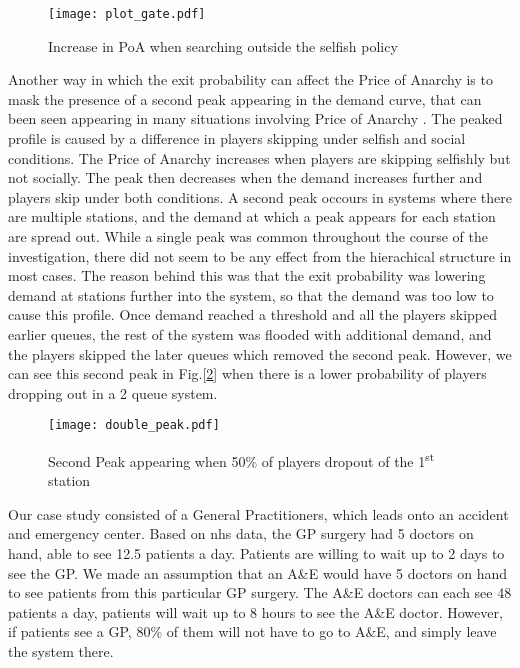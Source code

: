 \documentclass[12pt]{article}
\begin{document}
    \begin{figure}[ht]
    	\begin{center}

        	\texttt{[image: plot\_gate.pdf]}
            \caption{Increase in PoA when searching outside the selfish policy}
            \label{fig:Exit_ext}
      \end{center}
	\end{figure}

    Another way in which the exit probability can affect the Price of Anarchy is to mask the presence of a second peak appearing in the demand curve, that can been seen appearing in many situations involving Price of Anarchy \cite{cite011}. The peaked profile is caused by a difference in players skipping under selfish and social conditions. The Price of Anarchy increases when players are skipping selfishly but not socially. The peak then decreases when the demand increases further and players skip under both conditions. A second peak occours in systems where there are multiple stations, and the demand at which a peak appears for each station are spread out. While a single peak was common throughout the course of the investigation, there did not seem to be any effect from the hierachical structure in most cases. The reason behind this was that the exit probability was lowering demand at stations further into the system, so that the demand was too low to cause this profile. Once demand reached a threshold and all the players skipped earlier queues, the rest of the system was flooded with additional demand, and the players skipped the later queues which removed the second peak. However, we can see this second peak in Fig.[\ref{fig:Sec_peak}] when there is a lower probability of players dropping out in a 2 queue system.

        \begin{figure}[ht]
    	\begin{center}

        	\texttt{[image: double\_peak.pdf]}
            \caption{Second Peak appearing when 50\% of players dropout of the 1\textsuperscript{st} station}
            \label{fig:Sec_peak}
      \end{center}
	\end{figure}


    Our case study consisted of a General Practitioners, which leads onto an accident and emergency center. Based on nhs data, the GP surgery had 5 doctors on hand, able to see 12.5 patients a day. Patients are willing to wait up to 2 days to see the GP. We made an assumption that an A\&E would have 5 doctors on hand to see patients from this particular GP surgery. The A\&E doctors can each see 48 patients a day, patients will wait up to 8 hours to see the A\&E doctor. However, if patients see a GP, 80\% of them will not have to go to A\&E, and simply leave the system there.
\end{document}
